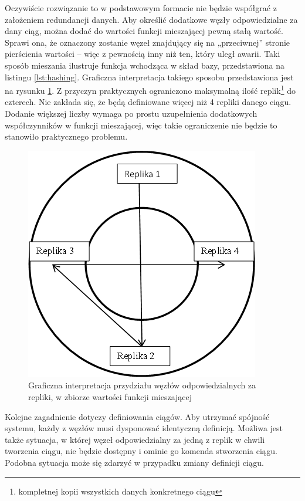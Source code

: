 \documentclass[a4paper,polish,12pt,twoside]{article}
\begin{document}
Oczywiście rozwiązanie to w podstawowym formacie nie będzie współgrać z założeniem redundancji danych. Aby określić dodatkowe węzły odpowiedzialne za dany ciąg, można dodać do wartości funkcji mieszającej pewną stałą wartość. Sprawi ona, że oznaczony zostanie węzeł znajdujący się na „przeciwnej” stronie pierścienia wartości – więc z pewnością inny niż ten, który uległ awarii. Taki sposób mieszania ilustruje funkcja wchodząca w skład bazy, przedstawiona na listingu \ref{lst:hashing}. Graficzna interpretacja takiego sposobu przedstawiona jest na rysunku \ref{fig:interp_token_ring_replicas}. Z przyczyn praktycznych ograniczono maksymalną ilość replik\footnote{kompletnej kopii wszystkich danych konkretnego ciągu} do czterech. Nie zakłada się, że będą definiowane więcej niż 4 repliki danego ciągu. Dodanie większej liczby wymaga po prostu uzupełnienia dodatkowych współczynników w funkcji mieszającej, więc takie ograniczenie nie będzie to stanowiło praktycznego problemu.

	\begin{figure}[h]
		\centering \includegraphics{interp_token_ring_replicas}
		\caption{Graficzna interpretacja przydziału węzłów odpowiedzialnych za repliki, w zbiorze wartości funkcji mieszającej}
		\label{fig:interp_token_ring_replicas}
	\end{figure}

Kolejne zagadnienie dotyczy definiowania ciągów. Aby utrzymać spójność systemu, każdy z węzłów musi dysponować identyczną definicją. Możliwa jest także sytuacja, w której węzeł odpowiedzialny za jedną z replik w chwili tworzenia ciągu, nie będzie dostępny i ominie go komenda stworzenia ciągu. Podobna sytuacja może się zdarzyć w przypadku zmiany definicji ciągu.
\end{document}

